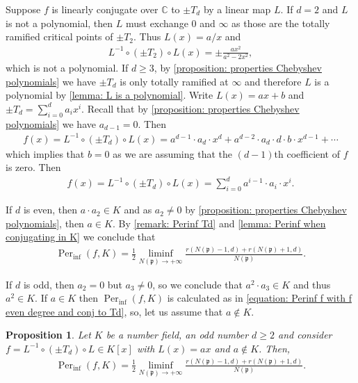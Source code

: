 \documentclass{amsart}
\def\CC{\mathbb C}
\DeclareMathOperator{\Per}{Per}
\newtheorem{proposition}{Proposition}[section]
\theoremstyle{definition}
\begin{document}
Suppose $f$ is linearly conjugate over $\CC$ to $\pm T_d$ by a linear map $L$. If $d = 2$ and $L$ is not a polynomial, then $L$ must exchange $0$ and $\infty$ as those are the totally ramified critical points of $\pm T_2$. Thus $L(x) = a/x$ and 
\begin{align*}
L^{-1} \circ (\pm T_2) \circ L(x) = \pm \frac{a x^2}{a^2-2x^2},
\end{align*}
which is not a polynomial. If $d \geq 3$, by \cref{proposition: properties Chebyshev polynomials} we have $\pm T_d$ is only totally ramified at $\infty$ and therefore $L$ is a polynomial by \cref{lemma: L is a polynomial}. Write $L(x) = ax+b$ and $\pm T_d = \sum_{i = 0}^d a_i x^i$. Recall that by \cref{proposition: properties Chebyshev polynomials} we have $a_{d-1} = 0$. Then
\begin{align*}
f(x) = L^{-1} \circ (\pm T_d) \circ L(x) = a^{d-1} \cdot a_d \cdot x^d + a^{d-2} \cdot a_d \cdot d \cdot b \cdot x^{d-1} + \cdots 
\end{align*}
which implies that $b = 0$ as we are assuming that the $(d-1)$th coefficient of $f$ is zero. Then 
\begin{align*}
f(x) = L^{-1} \circ (\pm T_d) \circ L(x) = \sum_{i = 0}^d a^{i-1} \cdot a_i \cdot x^i.
\end{align*}

If $d$ is even, then $a \cdot a_2 \in K$ and as $a_2 \neq 0$ by \cref{proposition: properties Chebyshev polynomials}, then $a \in K$. By \cref{remark: Perinf Td} and \cref{lemma: Perinf when conjugating in K} we conclude that 
\begin{align}
\Per_{\inf}(f,K) = \frac{1}{2} \liminf_{N(\mathfrak{p}) \rightarrow +\infty} \frac{r(N(\mathfrak{p})-1,d) + r(N(\mathfrak{p})+1,d)}{N(\mathfrak{p})}.
\label{equation: Perinf f with f even degree and conj to Td}
\end{align}

If $d$ is odd, then $a_2 = 0$ but $a_3 \neq 0$, so we conclude that $a^2 \cdot a_3 \in K$ and thus $a^2 \in K$. If $a \in K$ then $\Per_{\inf}(f,K)$ is calculated as in \cref{equation: Perinf f with f even degree and conj to Td}, so, let us assume that $a \notin K$.

\begin{proposition}
\label{proposition: Perinf f with a not in K}
Let $K$ be a number field, an odd number $d \geq 2$ and consider $f = L^{-1} \circ (\pm T_d) \circ L \in K[x]$ with $L(x) = ax$ and $a \notin K$. Then,  
\begin{align*}
\Per_{\inf}(f,K) = \frac{1}{2} \liminf_{N(\mathfrak{p}) \rightarrow +\infty} \frac{r(N(\mathfrak{p})-1,d) + r(N(\mathfrak{p})+1,d)}{N(\mathfrak{p})}.
\end{align*}
\end{proposition}
\end{document}
